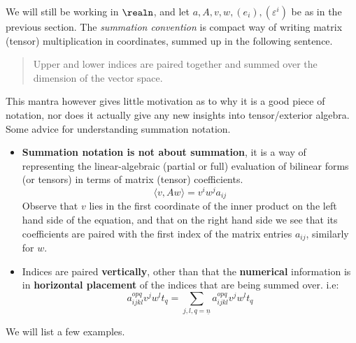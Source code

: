 \documentclass[../main-v2-manifolds.tex]{subfiles}
\begin{document}

We will still be working in $\realn$, and let $a, A, v, w, (e_i), (\varepsilon^i)$ be as in the previous section. The \emph{summation convention} is compact way of writing matrix (tensor) multiplication in coordinates, summed up in the following sentence.
\begin{quote}
Upper and lower indices are paired together and summed over the dimension of the vector space.    
\end{quote}
This mantra however gives little motivation as to why it is a good piece of notation, nor does it actually give any new insights into tensor/exterior algebra. \\

Some advice for understanding summation notation.
\begin{itemize}
    \item \textbf{Summation notation is not about summation}, it is a way of representing the linear-algebraic (partial or full) evaluation of bilinear forms (or tensors) in terms of matrix (tensor) coefficients.
    \[
        \langle v, Aw\rangle = v^iw^ja_{ij}
    \]
    Observe that $v$ lies in the first coordinate of the inner product on the left hand side of the equation, and that on the right hand side we see that its coefficients are paired with the first index of the matrix entries $a_{ij}$, similarly for $w$.
    \item Indices are paired \textbf{vertically}, other than that the \textbf{numerical} information is in \textbf{horizontal placement} of the indices that are being summed over. i.e:
    \[
        a_{ijkl}^{opq}v^jw^lt_q=\sum_{j,l,q=\underline{n}}a_{ijkl}^{opq}v^jw^lt_q
    \]
\end{itemize}
We will list a few examples. \\
\end{document}
